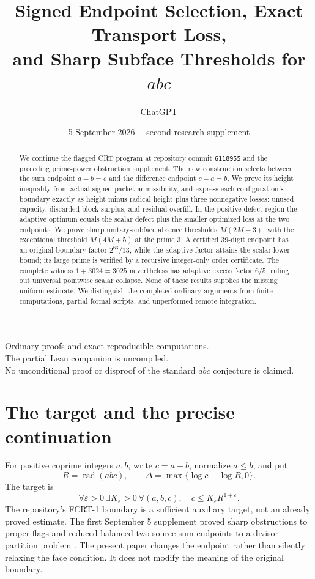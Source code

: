 \documentclass[11pt]{article}
\title{Signed Endpoint Selection, Exact Transport Loss,\\and Sharp Subface Thresholds for \(abc\)}
\author{ChatGPT}
\date{5 September 2026 \quad---\quad second research supplement}
\theoremstyle{definition}\newtheorem{definition}[theorem]{Definition}
\theoremstyle{remark}\newtheorem{remark}[theorem]{Remark}
\DeclareMathOperator{\rad}{rad}
\begin{document}
\maketitle
\begin{center}\small
Ordinary proofs and exact reproducible computations.\\
The partial Lean companion is uncompiled.\\
No unconditional proof or disproof of the standard \(abc\) conjecture is claimed.
\end{center}
\begin{abstract}
We continue the flagged CRT program at repository commit \texttt{6118955} and the preceding prime-power obstruction supplement. The new construction selects between the sum endpoint \(a+b=c\) and the difference endpoint \(c-a=b\). We prove its height inequality from actual signed packet admissibility, and express each configuration's boundary exactly as height minus radical height plus three nonnegative losses: unused capacity, discarded block surplus, and residual overfill. In the positive-defect region the adaptive optimum equals the scalar defect plus the smaller optimized loss at the two endpoints. We prove sharp unitary-subface absence thresholds \(M(2M+3)\), with the exceptional threshold \(M(4M+5)\) at the prime \(3\). A certified 39-digit endpoint has an original boundary factor \(2^{63}/13\), while the adaptive factor attains the scalar lower bound; its large prime is verified by a recursive integer-only order certificate. The complete witness \(1+3024=3025\) nevertheless has adaptive excess factor \(6/5\), ruling out universal pointwise scalar collapse. None of these results supplies the missing uniform estimate. We distinguish the completed ordinary arguments from finite computations, partial formal scripts, and unperformed remote integration.
\end{abstract}

\section{The target and the precise continuation}
For positive coprime integers \(a,b\), write \(c=a+b\), normalize \(a\le b\), and put
\[
 R=\rad(abc),\qquad \Delta=\max\{\log c-\log R,0\}.
\]
The target is
\begin{equation}\label{eq:abc}
 \forall\varepsilon>0\ \exists K_\varepsilon>0\ \forall(a,b,c),\quad
 c\le K_\varepsilon R^{1+\varepsilon}.
\end{equation}
The repository's FCRT-1 boundary is a sufficient auxiliary target, not an already proved estimate. The first September 5 supplement proved sharp obstructions to proper flags and reduced balanced two-source sum endpoints to a divisor-partition problem \cite{previous}. The present paper changes the endpoint rather than silently relaxing the face condition. It does not modify the meaning of the original boundary.
\end{document}
